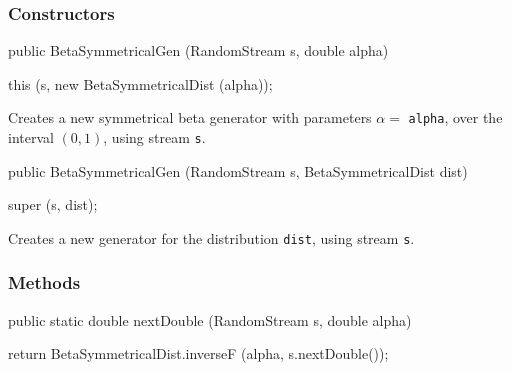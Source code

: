 \subsubsection* {Constructors}
\begin{code}

   public BetaSymmetricalGen (RandomStream s, double alpha) \begin{hide} {
      this (s, new BetaSymmetricalDist (alpha));
   }\end{hide}
\end{code}
\begin{tabb} Creates a new symmetrical beta generator with parameters $\alpha =$ 
  \texttt{alpha}, over the interval $(0,1)$, using stream \texttt{s}.
\end{tabb}
\begin{code}

   public BetaSymmetricalGen (RandomStream s, BetaSymmetricalDist dist) \begin{hide} {
      super (s, dist);
   }\end{hide}
\end{code}
  \begin{tabb} Creates a new generator for the distribution \texttt{dist},
     using stream \texttt{s}.
  \end{tabb}

\subsubsection* {Methods}
\begin{code}

   public static double nextDouble (RandomStream s, double alpha)\begin{hide} {
      return BetaSymmetricalDist.inverseF (alpha, s.nextDouble());
   }\end{hide}
\end{code}
\begin{code}\begin{hide}
}\end{hide}
\end{code}
